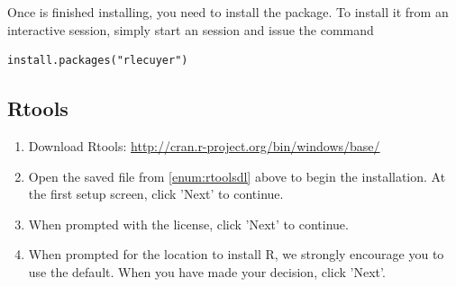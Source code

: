 Once  is finished installing, you need to install the  \href{http://cran.r-project.org/web/packages/rlecuyer/index.html}{} package.  To install it from an interactive  session, simply start an  session and issue the command
\begin{lstlisting}[language=rr]
install.packages("rlecuyer")
\end{lstlisting}





\subsection{Rtools}

\begin{enumerate}
  \item Download Rtools: \url{http://cran.r-project.org/bin/windows/base/} \label{enum:rtoolsdl}
  \item Open the saved file from \ref{enum:rtoolsdl} above to begin the installation.  At the first setup screen, click 'Next' to continue.
  \item When prompted with the license, click 'Next' to continue.
  \item When prompted for the location to install R, we strongly encourage you to use the default.  When you have made your decision, click 'Next'.

\end{enumerate}
